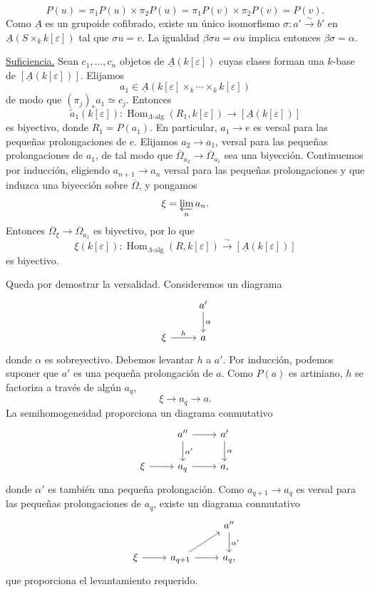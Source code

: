 
\[
 P(u)=\pi_1P(u)\times\pi_2P(u)
     =\pi_1P(v)\times\pi_2P(v)=P(v).
\]
Como $\underline A$ es un grupoide cofibrado, existe un único
isomorfismo $\sigma:a'\xrightarrow{\sim}b'$ en
$\underline A(S\times_k k[\varepsilon])$ tal que $\sigma u=v$.
La igualdad $\beta\sigma u=\alpha u$ implica entonces
$\beta\sigma=\alpha$.

\underline{Suficiencia.} Sean $c_1,\ldots,c_n$ objetos de
$\underline A(k[\varepsilon])$ cuyas clases forman una $k$-base de
$[\underline A(k[\varepsilon])]$. Elijamos
\[
 a_1\in\underline A(
 k[\varepsilon]\times_k\cdots\times_k k[\varepsilon])
\]
de modo que $(\pi_j)_*a_1\simeq c_j$. Entonces
\[
 \widetilde a_1(k[\varepsilon]):
 \operatorname{Hom}_{\Lambda\text{-alg}}(R_1,k[\varepsilon])
 \longrightarrow[\underline A(k[\varepsilon])]
\]
es biyectivo, donde $R_1=P(a_1)$. En particular,
$a_1\longrightarrow e$ es versal para las pequeñas prolongaciones de
$e$. Elijamos $a_2\longrightarrow a_1$, versal para las pequeñas
prolongaciones de $a_1$, de tal modo que
$\overline\Omega_{a_2}\longrightarrow\overline\Omega_{a_1}$ sea
una biyección. Continuemos por inducción, eligiendo
$a_{n+1}\longrightarrow a_n$ versal para las pequeñas prolongaciones
y que induzca una biyección sobre $\overline\Omega$, y pongamos
\[
 \xi=\varprojlim_n a_n.
\]
Entonces $\overline\Omega_\xi\longrightarrow\overline\Omega_{a_1}$
es biyectivo, por lo que
\[
 \xi(k[\varepsilon]):
 \operatorname{Hom}_{\Lambda\text{-alg}}(R,k[\varepsilon])
 \xrightarrow{\ \sim\ }
 [\underline A(k[\varepsilon])]
\]
es biyectivo.

Queda por demostrar la versalidad. Consideremos un diagrama
\[
\begin{tikzcd}
& a' \arrow[d,"\alpha"] \\
\xi \arrow[r,"h"] & a
\end{tikzcd}
\]
donde $\alpha$ es sobreyectivo. Debemos levantar $h$ a $a'$. Por
inducción, podemos suponer que $a'$ es una pequeña prolongación de
$a$. Como $P(a)$ es artiniano, $h$ se factoriza a través de algún
$a_q$,
\[
 \xi\longrightarrow a_q\longrightarrow a.
\]
La semihomogeneidad proporciona un diagrama conmutativo
\[
\begin{tikzcd}
& a'' \arrow[r] \arrow[d,"\alpha'"] & a' \arrow[d,"\alpha"] \\
\xi \arrow[r] & a_q \arrow[r] & a,
\end{tikzcd}
\]
donde $\alpha'$ es también una pequeña prolongación. Como
$a_{q+1}\longrightarrow a_q$ es versal para las pequeñas
prolongaciones de $a_q$, existe un diagrama conmutativo
\[
\begin{tikzcd}
& & a'' \arrow[d,"\alpha'"] \\
\xi \arrow[r] & a_{q+1} \arrow[r] \arrow[ur] & a_q,
\end{tikzcd}
\]
que proporciona el levantamiento requerido.


